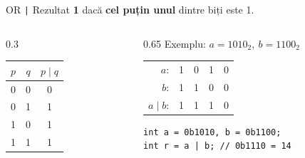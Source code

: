 \documentclass{beamer}
\begin{document}
\begin{frame}[fragile]{OR \textemdash{} \texttt{|}}
  Rezultat \textbf{1} dacă \textbf{cel puțin unul} dintre biți este 1.
  \bigskip
  \begin{columns}[T]
    \begin{column}{0.3\textwidth}
      \begin{center}
      \begin{tabular}{ccc}
        \toprule
        $p$ & $q$ & $p \mid q$ \\
        \midrule
        0 & 0 & 0 \\
        0 & 1 & 1 \\
        1 & 0 & 1 \\
        1 & 1 & 1 \\
        \bottomrule
      \end{tabular}
      \end{center}
    \end{column}
    \begin{column}{0.65\textwidth}
      Exemplu: $a = 1010_2,\ b = 1100_2$
      \begin{center}
      \begin{tabular}{rcccc}
        $a$:        & 1 & 0 & 1 & 0 \\
        $b$:        & 1 & 1 & 0 & 0 \\
        \hline
        $a \mid b$: & 1 & 1 & 1 & 0 \\
      \end{tabular}
      \end{center}
      \begin{center}
      \begin{lstlisting}
int a = 0b1010, b = 0b1100;
int r = a | b; // 0b1110 = 14
      \end{lstlisting}
      \end{center}
    \end{column}
  \end{columns}
\end{frame}
\end{document}
